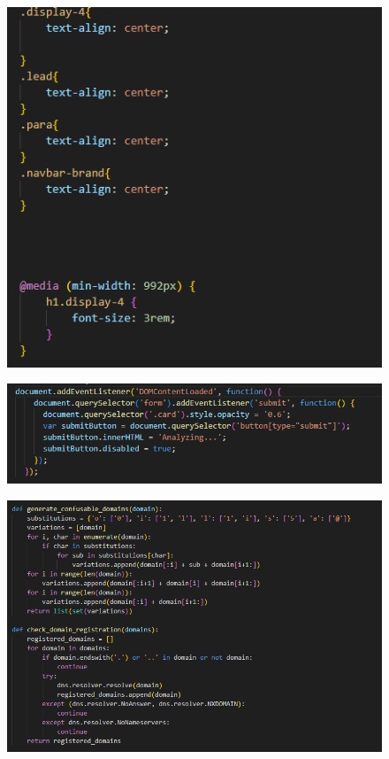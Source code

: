 \begin{figure}[h]
    \centering
    \includegraphics[width=0.8\linewidth]{appendix/a5.png}
    \label{fig:enter-label}
\end{figure}

\begin{figure}[h]
    \centering
    \includegraphics[width=0.8\linewidth]{appendix/a6.png}
    \label{fig:enter-label}
\end{figure}

\begin{figure}[h]
    \centering
    \includegraphics[width=0.8\linewidth]{appendix/a7.png}
\end{figure}


